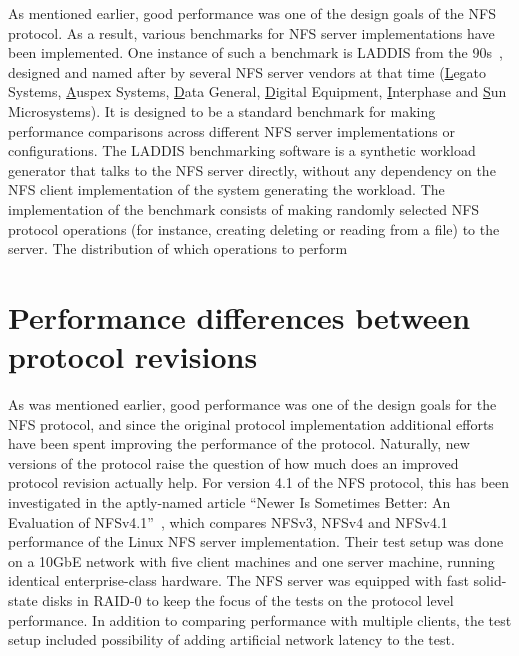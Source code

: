 As mentioned earlier, good performance was one of the design goals of the NFS protocol.
As a result, various benchmarks for NFS server implementations have been implemented.
One instance of such a benchmark is LADDIS from the 90s~\cite{LADDIS}, designed and named after by
several NFS server vendors at that time (\underline{L}egato Systems, \underline{A}uspex Systems, \underline{D}ata General,
\underline{D}igital Equipment, \underline{I}nterphase and \underline{S}un Microsystems).
It is designed to be a standard benchmark for making performance comparisons across different NFS server implementations
or configurations.
The LADDIS benchmarking software is a synthetic workload generator that talks to the NFS server directly,
without any dependency on the NFS client implementation of the system generating the workload.
The implementation of the benchmark consists of making randomly selected NFS protocol operations
(for instance, creating deleting or reading from a file)
to the server.
The distribution of which operations to perform

\section{Performance differences between protocol revisions}

As was mentioned earlier, good performance was one of the design goals for the NFS protocol,
and since the original protocol implementation additional efforts have been spent improving the performance of the protocol.
Naturally, new versions of the protocol raise the question of how much does an improved protocol revision actually help.
For version 4.1 of the NFS protocol, this has been investigated in the aptly-named article ``Newer Is Sometimes Better: An Evaluation of NFSv4.1''~\cite{NFSv4Better}, which compares NFSv3, NFSv4 and NFSv4.1 performance of the Linux NFS server implementation.
Their test setup was done on a 10GbE network with five client machines and one server machine, running identical enterprise-class hardware.
The NFS server was equipped with fast solid-state disks in RAID-0 to keep the focus of the tests on the protocol level performance.
In addition to comparing performance with multiple clients, the test setup included possibility of adding artificial network latency to the test.
